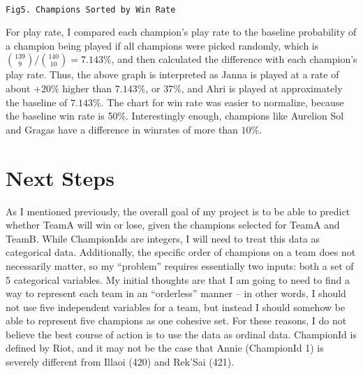 \documentclass[11pt]{article}
\begin{document}
    \begin{center}
    \end{center}
    { \hspace*{\fill} \\}
    
    \begin{Verbatim}[commandchars=\\\{\}]
                         Fig5. Champions Sorted by Win Rate                        

    \end{Verbatim}

    For play rate, I compared each champion's play rate to the baseline
probability of a champion being played if all champions were picked
randomly, which is \({139 \choose 9}/{140 \choose 10} = {7.143}\%\), and
then calculated the difference with each champion's play rate. Thus, the
above graph is interpreted as Janna is played at a rate of about
\(+20\%\) higher than \(7.143\%\), or \(37\%\), and Ahri is played at
approximately the baseline of \(7.143\%\). The chart for win rate was
easier to normalize, because the baseline win rate is 50\%.
Interestingly enough, champions like Aurelion Sol and Gragas have a
difference in winrates of more than \(10\%\).

    \section{Next Steps}\label{next-steps}

    As I mentioned previously, the overall goal of my project is to be able
to predict whether TeamA will win or lose, given the champions selected
for TeamA and TeamB. While ChampionIds are integers, I will need to
treat this data as categorical data. Additionally, the specific order of
champions on a team does not necessarily matter, so my ``problem''
requires essentially two inputs: both a set of 5 categorical variables.
My initial thoughts are that I am going to need to find a way to
represent each team in an ``orderless'' manner -- in other words, I
should not use five independent variables for a team, but instead I
should somehow be able to represent five champions as one cohesive set.
For these reasons, I do not believe the best course of action is to use
the data as ordinal data. ChampionId is defined by Riot, and it may not
be the case that Annie (ChampionId 1) is severely different from Illaoi
(420) and Rek'Sai (421).
\end{document}
